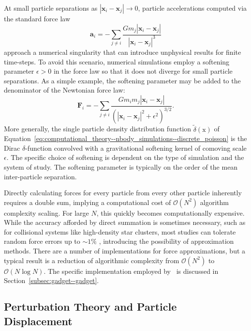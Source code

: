 At small particle separations as $|\mathbf{x}_{i} - \mathbf{x}_{j}| \rightarrow 0$, particle accelerations computed via the standard force law
\begin{equation}
	\mathbf{a}_{i} = -\sum_{j \ne i} \frac{G m_{j} | \mathbf{x}_{i} - \mathbf{x}_{j} |}{| \mathbf{x}_{i} - \mathbf{x}_{j} |^{3}}
\end{equation}
approach a numerical singularity that can introduce unphysical results for finite time-steps.  To avoid this scenario, numerical simulations employ a softening parameter $\epsilon > 0$ in the force law so that it does not diverge for small particle separations.  As a simple example, the softening parameter may be added to the denominator of the Newtonian force law:
\begin{equation}
	\mathbf{F}_{i} = -\sum_{j \ne i} \frac{G m_{i} m_{j} | \mathbf{x}_{i} - \mathbf{x}_{j} |}{(| \mathbf{x}_{i} - \mathbf{x}_{j} |^{2} + \epsilon^{2})^{3/2}}.
\end{equation}
More generally, the single particle density distribution function $\tilde{\delta}(\mathrm{x})$ of Equation~\ref{eq:computational_theory--nbody_simulations--discrete_poisson} is the Dirac $\delta$-function convolved with a gravitational softening kernel of comoving scale $\epsilon$.  The specific choice of softening is dependent on the type of simulation and the system of study.  The softening parameter is typically on the order of the mean inter-particle separation.

Directly calculating forces for every particle from every other particle inherently requires a double sum, implying a computational cost of $\mathcal{O}(N^{2})$ algorithm complexity scaling.  For large $N$, this quickly becomes computationally expensive.  While the accuracy afforded by direct summation is sometimes necessary, such as for collisional systems like high-density star clusters, most studies can tolerate random force errors up to $\sim 1\%$ \citep{1993ApJ...402L..85H}, introducing the possibility of approximation methods.  There are a number of implementations for force approximations, but a typical result is a reduction of algorithmic complexity from $\mathcal{O}(N^{2})$ to $\mathcal{O}(N \log N)$.  The specific implementation employed by \gadgettwo\ is discussed in Section~\ref{subsec:gadget--gadget}.




\subsection{Perturbation Theory and Particle Displacement}
\label{subsec:computational_theory--perturbation_theory}


